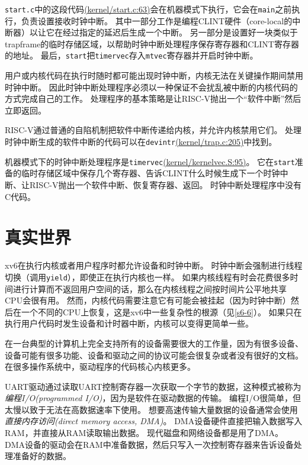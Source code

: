 \texttt{start.c}中的这段代码\href{https://github.com/mit-pdos/xv6-riscv/blob/risc/kernel/start.c#L63/start.c:63}{(kernel/start.c:63)}会在机器模式下执行，它会在\texttt{main}之前执行，负责设置接收时钟中断。
其中一部分工作是编程CLINT硬件（core-local的中断器）以让它在经过指定的延迟后生成一个中断。
另一部分是设置好一块类似于trapframe的临时存储区域，以帮助时钟中断处理程序保存寄存器和CLINT寄存器的地址。
最后，\texttt{start}把\texttt{timervec}存入\texttt{mtvec}寄存器并开启时钟中断。

用户或内核代码在执行时随时都可能出现时钟中断，内核无法在关键操作期间禁用时钟中断。
因此时钟中断处理程序必须以一种保证不会扰乱被中断的内核代码的方式完成自己的工作。
处理程序的基本策略是让RISC-V抛出一个“软件中断”然后立即返回。

RISC-V通过普通的自陷机制把软件中断传递给内核，并允许内核禁用它们。
处理时钟中断生成的软件中断的代码可以在\texttt{devintr}\href{https://github.com/mit-pdos/xv6-riscv/blob/risc/kernel/trap.c#L205}{(kernel/trap.c:205)}中找到。

机器模式下的时钟中断处理程序是\texttt{timervec}\href{https://github.com/mit-pdos/xv6-riscv/blob/risc/kernel/kernelvec.S#L95}{(kernel/kernelvec.S:95)}。
它在\texttt{start}准备的临时存储区域中保存几个寄存器、告诉CLINT什么时候生成下一个时钟中断、让RISC-V抛出一个软件中断、恢复寄存器、返回。
时钟中断处理程序中没有C代码。

\section{真实世界}
xv6在执行内核或者用户程序时都允许设备和时钟中断。
时钟中断会强制进行线程切换（调用\texttt{yield}），即使正在执行内核也一样。
如果内核线程有时会花费很多时间进行计算而不返回用户空间的话，那么在内核线程之间按时间片公平地共享CPU会很有用。
然而，内核代码需要注意它有可能会被挂起（因为时钟中断）然后在一个不同的CPU上恢复，这是xv6中一些复杂性的根源（见\autoref{s6-6}）。
如果只在执行用户代码时发生设备和计时器中断，内核可以变得更简单一些。

在一台典型的计算机上完全支持所有的设备需要很大的工作量，因为有很多设备、设备可能有很多功能、设备和驱动之间的协议可能会很复杂或者没有很好的文档。
在很多操作系统中，驱动程序的代码核心内核更多。

UART驱动通过读取UART控制寄存器一次获取一个字节的数据，这种模式被称为\emph{编程I/O(programmed I/O)}，因为是软件在驱动数据的传输。
编程I/O很简单，但太慢以致于无法在高数据速率下使用。
想要高速传输大量数据的设备通常会使用\emph{直接内存访问(direct memory access, DMA)}。
DMA设备硬件直接把输入数据写入RAM，并直接从RAM读取输出数据。
现代磁盘和网络设备都是用了DMA。
DMA设备的驱动会在RAM中准备数据，然后只写入一次控制寄存器来告诉设备处理准备好的数据。

